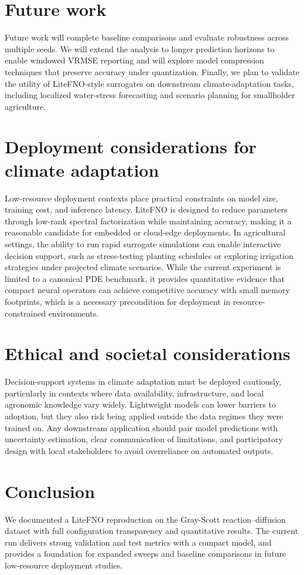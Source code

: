 \documentclass[11pt]{article}
\begin{document}
\section{Future work}
Future work will complete baseline comparisons and evaluate robustness across
multiple seeds. We will extend the analysis to longer prediction horizons to
enable windowed VRMSE reporting and will explore model compression techniques
that preserve accuracy under quantization. Finally, we plan to validate the
utility of LiteFNO-style surrogates on downstream climate-adaptation tasks,
including localized water-stress forecasting and scenario planning for
smallholder agriculture.

\section{Deployment considerations for climate adaptation}
Low-resource deployment contexts place practical constraints on model size,
training cost, and inference latency. LiteFNO is designed to reduce parameters
through low-rank spectral factorization while maintaining accuracy, making it a
reasonable candidate for embedded or cloud-edge deployments. In agricultural
settings, the ability to run rapid surrogate simulations can enable interactive
decision support, such as stress-testing planting schedules or exploring
irrigation strategies under projected climate scenarios. While the current
experiment is limited to a canonical PDE benchmark, it provides quantitative
evidence that compact neural operators can achieve competitive accuracy with
small memory footprints, which is a necessary precondition for deployment in
resource-constrained environments.

\section{Ethical and societal considerations}
Decision-support systems in climate adaptation must be deployed cautiously,
particularly in contexts where data availability, infrastructure, and local
agronomic knowledge vary widely. Lightweight models can lower barriers to
adoption, but they also risk being applied outside the data regimes they were
trained on. Any downstream application should pair model predictions with
uncertainty estimation, clear communication of limitations, and participatory
design with local stakeholders to avoid overreliance on automated outputs.

\section{Conclusion}
We documented a LiteFNO reproduction on the Gray-Scott reaction--diffusion
dataset with full configuration transparency and quantitative results. The
current run delivers strong validation and test metrics with a compact model,
and provides a foundation for expanded sweeps and baseline comparisons in
future low-resource deployment studies.



\end{document}
